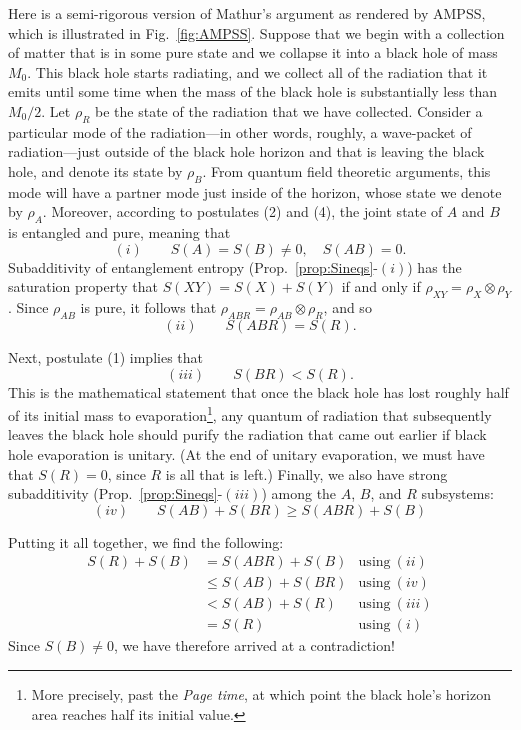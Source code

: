 \documentclass[a4paper,11pt]{article}
\newcommand{\Fig}[1]{Fig.~\ref{#1}}
\begin{document}
Here is a semi-rigorous version of Mathur's argument as rendered by AMPSS, which is illustrated in \Fig{fig:AMPSS}.
Suppose that we begin with a collection of matter that is in some pure state and we collapse it into a black hole of mass $M_0$.
This black hole starts radiating, and we collect all of the radiation that it emits until some time when the mass of the black hole is substantially less than $M_0/2$.
Let $\rho_R$ be the state of the radiation that we have collected.
Consider a particular mode of the radiation---in other words, roughly, a wave-packet of radiation---just outside of the black hole horizon and that is leaving the black hole, and denote its state by $\rho_B$.
From quantum field theoretic arguments, this mode will have a partner mode just inside of the horizon, whose state we denote by $\rho_A$.
Moreover, according to postulates (2) and (4), the joint state of $A$ and $B$ is entangled and pure, meaning that
\begin{equation*}
(i) \qquad S(A) = S(B) \neq 0, \quad S(AB) = 0.
\end{equation*}
Subadditivity of entanglement entropy (Prop.~\ref{prop:Sineqs}-$(i)$) has the saturation property that $S(XY) = S(X) + S(Y)$ if and only if $\rho_{XY} = \rho_X \otimes \rho_{Y}$.
Since $\rho_{AB}$ is pure, it follows that $\rho_{ABR} = \rho_{AB} \otimes \rho_R$, and so
\begin{equation*}
(ii) \qquad S(ABR) = S(R).
\end{equation*}

Next, postulate (1) implies that
\begin{equation*}
(iii) \qquad S(BR) < S(R).
\end{equation*}
This is the mathematical statement that once the black hole has lost roughly half of its initial mass to evaporation\footnote{More precisely, past the \emph{Page time}, at which point the black hole's horizon area reaches half its initial value.}, any quantum of radiation that subsequently leaves the black hole should purify the radiation that came out earlier if black hole evaporation is unitary.
(At the end of unitary evaporation, we must have that $S(R) = 0$, since $R$ is all that is left.)
Finally, we also have strong subadditivity (Prop.~\ref{prop:Sineqs}-$(iii)$) among the $A$, $B$, and $R$ subsystems:
\begin{equation*}
(iv) \qquad S(AB) + S(BR) \geq S(ABR) + S(B)
\end{equation*}

Putting it all together, we find the following:
\begin{align*}
S(R) + S(B) &= S(ABR) + S(B) & \text{using}~(ii) \\
&\leq S(AB) + S(BR) & \text{using}~(iv) \\
&< S(AB) + S(R) & \text{using}~(iii) \\
&= S(R) & \text{using}~(i)
\end{align*}
Since $S(B) \neq 0$, we have therefore arrived at a contradiction!
\end{document}
